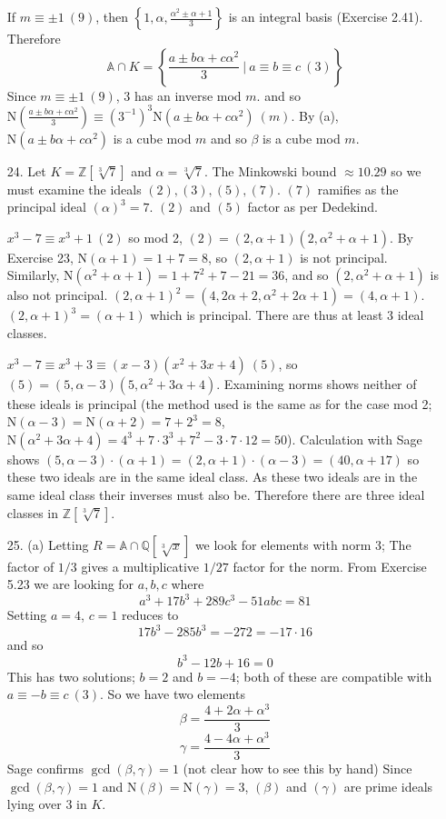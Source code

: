 \documentclass{article}
\newcommand{\Q}[0]{\mathbb{Q}}
\newcommand{\Z}[0]{\mathbb{Z}}
\newcommand{\norm}[0]{\text{N}}
\newcommand{\modequiv}[3]{#1 \equiv #2\ (#3)}
\newcommand{\ringofintegers}[1]{\mathbb{A} \cap #1}
\begin{document}
\begin{enumerate}
    If $m \equiv \pm 1\ (9)$, then $\left\{1, \alpha, \frac{\alpha^2 \pm \alpha + 1}{3}\right\}$ is an integral basis (Exercise 2.41).  Therefore \[\ringofintegers{K} = \left\{\frac{a \pm b\alpha + c\alpha^2}{3}\ |\ a \equiv b \equiv c \ (3) \right\}\]  Since $m \equiv \pm 1\ (9)$, 3 has an inverse mod $m$. and so $\norm(\frac{a \pm b\alpha + c\alpha^2}{3}) \equiv (3^{-1})^3 \norm(a \pm b\alpha + c\alpha^2)\ (m)$.  By (a), $\norm(a \pm b\alpha + c\alpha^2)$ is a cube mod $m$ and so $\beta$ is a cube mod $m$.

    \item[24.]  Let $K = \Z[\sqrt[3]{7}]$ and $\alpha = \sqrt[3]{7}$.  The Minkowski bound $\approx 10.29$ so we must examine the ideals $(2), (3), (5), (7)$.  $(7)$ ramifies as the principal ideal $(\alpha)^3 = 7$.  $(2)$ and $(5)$ factor as per Dedekind.

    $\modequiv{x^3 - 7}{x^3 + 1}{2}$ so mod 2, $(2) = (2, \alpha + 1)(2, \alpha^2 + \alpha + 1)$.  By Exercise 23, $\norm(\alpha + 1) = 1 + 7 = 8$, so $(2, \alpha + 1)$ is not principal.  Similarly, $\norm(\alpha^2 + \alpha + 1) = 1 + 7^2 + 7 - 21 = 36$, and so $(2, \alpha^2 + \alpha + 1)$ is also not principal.  $(2, \alpha + 1)^2 = (4, 2\alpha+2, \alpha^2 + 2\alpha + 1) = (4, \alpha + 1)$.  $(2, \alpha + 1)^3 = (\alpha + 1)$ which is principal.  There are thus at least 3 ideal classes.

    $x^3 - 7 \equiv x^3 + 3 \equiv (x - 3)(x^2 + 3x+ 4)\ (5)$, so $(5) = (5, \alpha - 3)(5, \alpha^2 + 3\alpha + 4)$.  Examining norms shows neither of these ideals is principal (the method used is the same as for the case mod 2; $\norm(\alpha - 3) = \norm(\alpha + 2) = 7 + 2^3 = 8$, $\norm(\alpha^2 + 3\alpha + 4) = 4^3 + 7 \cdot 3^3 + 7^2 - 3 \cdot 7 \cdot 12 = 50$).  Calculation with Sage shows $(5, \alpha - 3) \cdot (\alpha + 1) = (2, \alpha + 1) \cdot (\alpha - 3) = (40, \alpha + 17)$ so these two ideals are in the same ideal class.  As these two ideals are in the same ideal class their inverses must also be.  Therefore there are three ideal classes in $\Z[\sqrt[3]{7}]$.

    \item[25. (a)] Letting $R = \ringofintegers{\Q[\sqrt[3]{x}]}$ we look for elements with norm 3; The factor of $1/3$ gives a multiplicative $1/27$ factor for the norm.  From Exercise 5.23 we are looking for $a, b, c$ where
    \[ a^3 + 17b^3 + 289c^3 - 51abc = 81 \]
    Setting $a = 4$, $c = 1$ reduces to
    \[ 17b^3 - 285b^3 = -272 = -17 \cdot 16 \]
    and so \[ b^3 - 12b + 16 = 0 \]
    This has two solutions; $b = 2$ and $b = -4$; both of these are compatible with $a \equiv -b \equiv c\ (3)$.  So we have two elements
    \[ \beta = \frac{4 + 2\alpha + \alpha^3}{3} \]
    \[ \gamma = \frac{4 - 4\alpha + \alpha^3}{3} \]
    Sage confirms $\gcd(\beta, \gamma) = 1$  (not clear how to see this by hand)
    Since $\gcd(\beta, \gamma) = 1$ and $\norm(\beta) = \norm(\gamma) = 3$, $(\beta)$ and $(\gamma)$ are prime ideals lying over 3 in $K$.


\end{enumerate}
\end{document}
